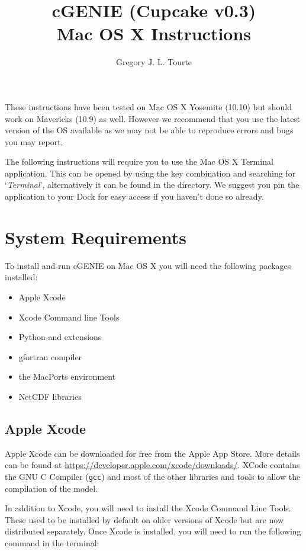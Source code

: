 \documentclass{scrartcl}
\title{cGENIE (Cupcake v0.3)\\
Mac OS X Instructions}
\author{Gregory J. L. Tourte}
\begin{document}
\maketitle

These instructions have been tested on Mac OS X Yosemite (10.10) but should
work on Mavericks (10.9) as well. However we recommend that you use the latest
version of the OS available as we may not be able to reproduce errors and bugs
you may report.

The following instructions will require you to use the Mac OS X Terminal
application. This can be opened by using the \keys{\cmd+\SPACE} key combination
and searching for `\textit{Terminal}', alternatively it can be found in the
 directory. We suggest you pin
the application to your Dock for easy access if you haven't done so already.

\section{System Requirements}

To install and run cGENIE on Mac OS X you will need the following packages
installed:

\begin{itemize}
	\item Apple Xcode
	\item Xcode Command line Tools
	\item Python and extensions
	\item gfortran compiler 
	\item the MacPorts environment
	\item NetCDF libraries
\end{itemize}

\subsection{Apple Xcode}

Apple Xcode can be downloaded for free from the Apple App Store. More details
can be found at \url{https://developer.apple.com/xcode/downloads/}. XCode
contains the GNU C Compiler (\texttt{gcc}) and most of the other libraries and
tools to allow the compilation of the model.

In addition to Xcode, you will need to install the Xcode Command Line Tools.
These used to be installed by default on older versions of Xcode but are now
distributed separately. Once Xcode is installed, you will need to run the
following command in the terminal:
\end{document}

